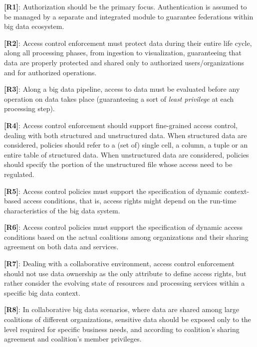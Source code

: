 \noindent \textbf{[R1]}: Authorization should be the primary focus. Authentication is assumed to be managed by a separate and integrated module to guarantee federations within big data ecosystem.

\noindent \textbf{[R2]}: Access control enforcement must protect data during their entire life cycle, along all processing phases, from ingestion to visualization, guaranteeing that data are properly protected and shared only to authorized users/organizations and for authorized operations.

\noindent  \textbf{[R3]}: Along a big data pipeline, access to data must be evaluated before any operation on data takes place (guaranteeing a sort of \emph{least privilege} at each processing step).

\noindent \textbf{[R4]}: Access control enforcement should support fine-grained access control, dealing with both structured and unstructured data. When structured data are considered, policies should refer to a (set of) single cell, a column, a tuple or an entire table of structured data. When unstructured data are considered, policies should specify the portion of the unstructured file whose access need to be regulated.

\noindent  \textbf{[R5]}: Access control policies must support the specification of dynamic context-based access conditions, that is, access rights might depend on the run-time characteristics of the big data system.

\noindent  \textbf{[R6]}: Access control policies must support the specification of dynamic access conditions based on the actual coalitions among organizations and their sharing agreement on both data and services.

\noindent  \textbf{[R7]}: Dealing with a collaborative environment, access control enforcement should not use data ownership as the only attribute to define access rights, but rather consider the evolving state of resources and processing services within a specific big data context. 

\noindent  \textbf{[R8]}: In collaborative big data scenarios, where data are shared among large coalitions of different organizations, sensitive data should be exposed only to the level required for specific business needs, and according to coalition's sharing agreement and coalition's member privileges.

